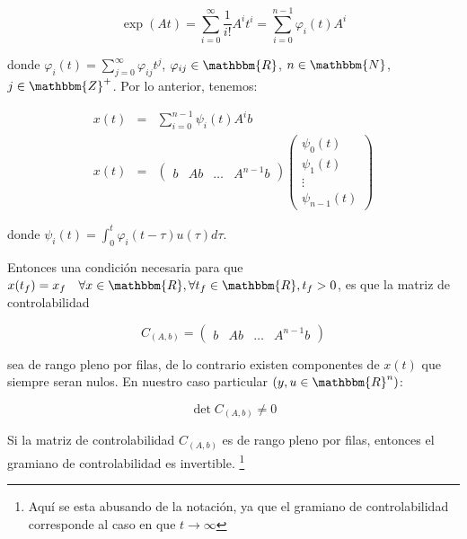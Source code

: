         \begin{equation}
            \exp{(A t)} = \sum\limits_{i=0}^{\infty} \frac{1}{i!} A^i t^i = \sum\limits_{i=0}^{n-1} \varphi_i(t) A^i
        \end{equation}

        donde $\varphi_i(t) = \sum\limits_{j=0}^{\infty} \varphi_{ij} t^j$, $\varphi_{ij} \in \mathbbm{R}$, $n \in \mathbbm{N}$, $j \in \mathbbm{Z}^+$. Por lo anterior, tenemos:

        \begin{eqnarray}
        x(t) & = & \sum\limits_{i=0}^{n-1} \psi_i(t) A^i b \nonumber \\
        x(t) & = &
        \begin{pmatrix}
        b & A b & \dots & A^{n-1} b
        \end{pmatrix}
        \begin{pmatrix}
        \psi_0(t) \\
        \psi_1(t) \\
        \vdots \\
        \psi_{n-1}(t)
        \end{pmatrix}
        \end{eqnarray}

        donde $\psi_i(t) = \int_0^t \varphi_i (t - \tau) u(\tau) d \tau$.

        Entonces una condición necesaria para que $x(t_f) = x_f \quad \forall x \in \mathbbm{R}, \forall t_f \in \mathbbm{R}, t_f > 0$, es que la matriz de controlabilidad

        \begin{equation}
            C_{(A,b)} =
            \begin{pmatrix}
            b & Ab & \dots & A^{n-1}b
            \end{pmatrix}
        \end{equation}

        sea de rango pleno por filas, de lo contrario existen componentes de $x(t)$ que siempre seran nulos. En nuestro caso particular $\left( y, u \in \mathbbm{R}^n \right)$:

        \begin{equation}
            \det{C_{(A,b)}} \ne 0
        \end{equation}

        Si la matriz de controlabilidad $C_{(A,b)}$ es de rango pleno por filas, entonces el gramiano de controlabilidad es invertible. \footnote{Aquí se esta abusando de la notación, ya que el gramiano de controlabilidad corresponde al caso en que $t \to \infty$}

